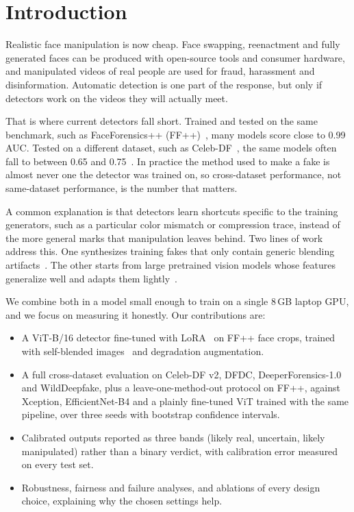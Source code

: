 \section{Introduction}

Realistic face manipulation is now cheap. Face swapping, reenactment and fully generated faces
can be produced with open-source tools and consumer hardware, and manipulated videos of real
people are used for fraud, harassment and disinformation. Automatic detection is one part of the
response, but only if detectors work on the videos they will actually meet.

That is where current detectors fall short. Trained and tested on the same benchmark, such as
FaceForensics++ (FF++)~\citep{rossler2019faceforensics}, many models score close to 0.99 AUC.
Tested on a different dataset, such as Celeb-DF~\citep{li2020celebdf}, the same models often fall
to between 0.65 and 0.75~\citep{li2020celebdf,yan2023deepfakebench}. In practice the method used
to make a fake is almost never one the detector was trained on, so cross-dataset performance,
not same-dataset performance, is the number that matters.

A common explanation is that detectors learn shortcuts specific to the training generators,
such as a particular color mismatch or compression trace, instead of the more general marks that
manipulation leaves behind. Two lines of work address this. One synthesizes training fakes that
only contain generic blending artifacts~\citep{li2020facexray,shiohara2022sbi}. The other starts
from large pretrained vision models whose features generalize well and adapts them
lightly~\citep{ojha2023towards}.

We combine both in a model small enough to train on a single 8\,GB laptop GPU, and we focus on
measuring it honestly. Our contributions are:
\begin{itemize}
  \item A ViT-B/16 detector fine-tuned with LoRA~\citep{hu2022lora} on FF++ face crops, trained
        with self-blended images~\citep{shiohara2022sbi} and degradation augmentation.
  \item A full cross-dataset evaluation on Celeb-DF v2, DFDC, DeeperForensics-1.0 and
        WildDeepfake, plus a leave-one-method-out protocol on FF++, against Xception,
        EfficientNet-B4 and a plainly fine-tuned ViT trained with the same pipeline, over three
        seeds with bootstrap confidence intervals.
  \item Calibrated outputs reported as three bands (likely real, uncertain, likely manipulated)
        rather than a binary verdict, with calibration error measured on every test set.
  \item Robustness, fairness and failure analyses, and ablations of every design choice,
        explaining why the chosen settings help.
\end{itemize}
